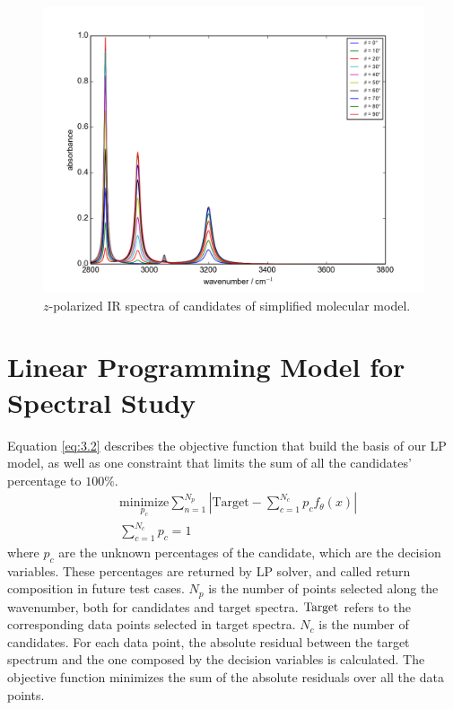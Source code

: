 \begin{figure}[!ht] 
\centering
\includegraphics[scale=0.7]{Figures/Toy_Model_IR_Cosine_Projection.png} 
\caption{$z$-polarized IR spectra of candidates of simplified molecular model.} \label{fig:3.1}
\end{figure}


\section{Linear Programming Model for Spectral Study}

Equation \ref{eq:3.2} describes the objective function that build the basis of our LP model, as well as one constraint that limits the sum of all the candidates' percentage to $100\%$. \\

\begin{eqnarray} \label{eq:3.2}
& \underset{p_{c}} {\text{minimize}} \displaystyle\sum^{N_{p}}_{n=1} \left| \text{Target}- \displaystyle\sum^{N_{c}}_{c=1}p_{c}f_{\theta}(x) \right|   \nonumber \\
& \displaystyle\sum^{N_{c}}_{c=1}p_{c} = 1 
\end{eqnarray}
where $p_{c}$ are the unknown percentages of the candidate, which are the decision variables. These percentages are returned by LP solver, and called return composition in future test cases. $N_{p}$ is the number of points selected along the wavenumber, both for candidates and target spectra. $\rm Target$ refers to the corresponding data points selected in target spectra. $N_{c}$ is the number of candidates. For each data point, the absolute residual between the target spectrum and the one composed by the decision variables is calculated. The objective function minimizes the sum of the absolute residuals over all the data points. \\

